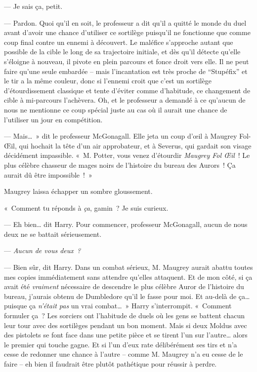 --- Je sais ça, petit.

--- Pardon.
Quoi qu'il en soit, le professeur a dit qu'il a quitté le monde du duel avant d'avoir une chance d'utiliser ce sortilège puisqu'il ne fonctionne que comme coup final contre un ennemi à découvert.
Le maléfice s'approche autant que possible de la cible le long de sa trajectoire initiale, et dès qu'il détecte qu'elle s'éloigne à nouveau, il pivote en plein parcours et fonce droit vers elle.
Il ne peut faire qu'une seule embardée -- mais l'incantation est très proche de “Stupéfix” et le tir a la même couleur, donc si l'ennemi croit que c'est un sortilège d'étourdissement classique et tente d'éviter comme d'habitude, ce changement de cible à mi-parcours l'achèvera.
Oh, et le professeur a demandé à ce qu'aucun de nous ne mentionne ce coup spécial juste au cas où il aurait une chance de l'utiliser un jour en compétition.

--- Mais…~»
dit le professeur McGonagall.
Elle jeta un coup d'œil à Maugrey Fol-Œil, qui hochait la tête d'un air approbateur, et à Severus, qui gardait son visage décidément impassible.
«~M. Potter, vous venez d'étourdir \emph{Maugrey Fol Œil}~!
Le plus célèbre chasseur de mages noirs de l'histoire du bureau des Aurors~!
Ça aurait dû être impossible~!~»

Maugrey laissa échapper un sombre gloussement.

«~Comment tu réponds à \emph{ça}, gamin~?
Je suis curieux.

--- Eh bien… dit Harry.
Pour commencer, professeur McGonagall, aucun de nous deux ne se battait sérieusement.

--- \emph{Aucun de vous deux~?}

--- Bien sûr, dit Harry.
Dans un combat sérieux, M. Maugrey aurait abattu toutes mes copies immédiatement sans attendre qu'elles attaquent.
Et de mon côté, si ça avait été \emph{vraiment} nécessaire de descendre le plus célèbre Auror de l'histoire du bureau, j'aurais obtenu de Dumbledore qu'il le fasse pour moi.
Et au-delà de ça… puisque ça \emph{n'était pas} un vrai combat…~»
Harry s'interrompit.
«~Comment formuler ça~?
Les sorciers ont l'habitude de duels où les gens se battent chacun leur tour avec des sortilèges pendant un bon moment.
Mais si deux Moldus avec des pistolets se font face dans une petite pièce et se tirent l'un sur l'autre… alors le premier qui touche gagne.
Et si l'un d'eux rate délibérément ses tirs et n'a cesse de redonner une chance à l'autre -- comme M. Maugrey n'a eu cesse de le faire -- eh bien il faudrait être plutôt pathétique pour réussir à perdre.

